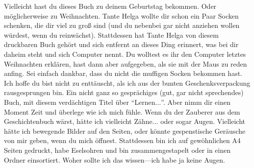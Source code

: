 Vielleicht hast du dieses Buch zu deinem Geburtstag bekommen. Oder möglicherweise zu Weihnachten. Tante Helga wollte dir schon ein Paar Socken schenken, die dir viel zu groß sind (und du nebenbei gar nicht anziehen wollen würdest, wenn du reinwächst). Stattdessen hat Tante Helga von diesem druckbaren Buch gehört und sich entfernt an dieses Ding erinnert, was bei dir daheim steht und sich Computer nennt. Du wolltest es ihr den Computer letztes Weihnachten erklären, hast dann aber aufgegeben, als sie mit der Maus zu reden anfing. Sei einfach dankbar, dass du nicht die muffigen Socken bekommen hast.
Ich hoffe du bist nicht zu enttäuscht, als ich aus der bunten Geschenksverpackung rausgesprungen bin. Ein nicht ganz so gesprächiges (gut, gar nicht sprechendes) Buch, mit diesem verdächtigen Titel über ``Lernen$\ldots$''.
Aber nimm dir einen Moment Zeit und überlege wie ich mich fühle. Wenn du der Zauberer aus dem Geschichtenbuch wärst, hätte ich vielleicht Zähne... oder sogar Augen. Vielleicht hätte ich bewegende Bilder auf den Seiten, oder könnte gespenstische Geräusche von mir geben, wenn du mich öffnest. Stattdessen bin ich auf gewöhnlichen A4 Seiten gedruckt, habe Eselsohren und bin zusammengestapelt oder in einen Ordner einsortiert. Woher sollte ich das wissen---ich habe ja keine Augen.
\\
\\
